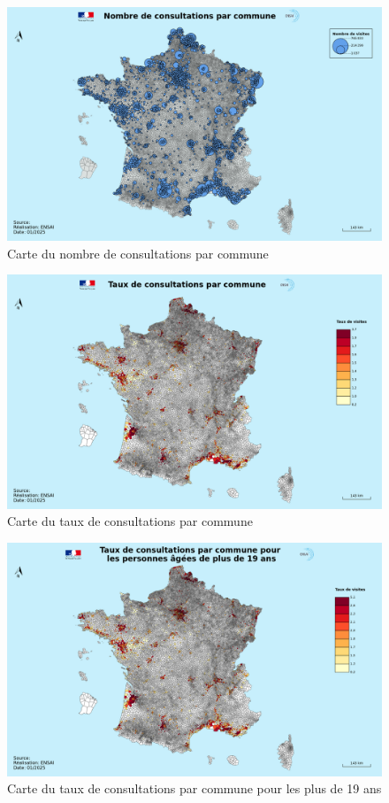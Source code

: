\documentclass[
]{article}
\begin{document}
\begin{figure}
    \centering
    \includegraphics[width=1\linewidth]{../cartes/nombre_de_consulatations}
    \caption{Carte du nombre de consultations par commune}
    \label{fig:figure}
\end{figure}

\begin{figure}
    \centering
    \includegraphics[width=1\linewidth]{../cartes/taux_de_consultations}
    \caption{Carte du taux de consultations par commune}
    \label{fig:figure}
\end{figure}

\begin{figure}
    \centering
    \includegraphics[width=1\linewidth]{../cartes/taux_de_consultations_plus_19_ans}
    \caption{Carte du taux de consultations par commune pour les plus de 19 ans}
    \label{fig:figure}
\end{figure}
\end{document}
